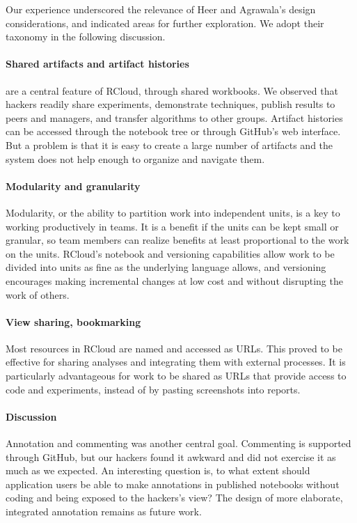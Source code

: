 Our experience underscored the relevance of Heer and Agrawala's design
considerations, and indicated areas for further exploration. We adopt
their taxonomy in the following discussion.

\paragraph*{Shared artifacts and artifact histories} are a central feature
of RCloud, through shared workbooks. We observed that hackers readily
share experiments, demonstrate techniques, publish results to peers and
managers, and transfer algorithms to other groups. Artifact histories
can be accessed through the notebook tree or through GitHub's web interface.
But a problem is that it is easy to create a large number of artifacts
and the system does not help enough to organize and navigate them.

\paragraph*{Modularity and granularity} Modularity, or the ability
to partition work into independent units, is a key to working
productively in teams.
It is a benefit if the units can be kept small or granular, so team members
can realize benefits at least proportional to the work on the units.
RCloud's notebook and versioning capabilities allow work to be divided
into units as fine as the underlying language allows, and versioning
encourages making incremental changes at low cost and without disrupting
the work of others.

\paragraph*{View sharing, bookmarking} Most resources in RCloud are named
and accessed as URLs. This proved to be effective for sharing analyses
and integrating them with external processes.  It is particularly
advantageous for work to be shared as URLs that provide access to code
and experiments, instead of by pasting screenshots into reports.

\paragraph*{Discussion} Annotation and commenting was another central goal.
Commenting is supported through GitHub, but our hackers found it
awkward and did not exercise it as much as we expected.
An interesting question is, to what extent should application users
be able to make annotations in published notebooks without coding
and being exposed to the hackers's view? The design of
more elaborate, integrated annotation remains as future work.

